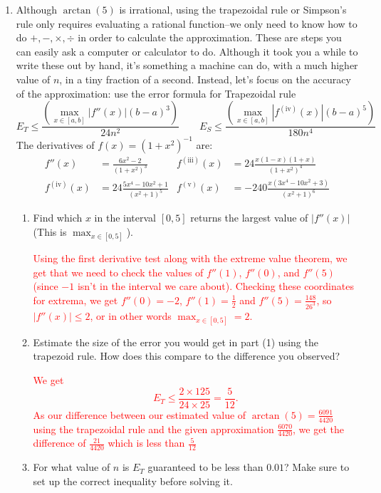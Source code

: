 \documentclass[11pt]{article}
\newcommand{\red}{\textcolor{red}}
\begin{document}
\begin{enumerate}
        \newpage
        \item Although $\arctan(5)$ is irrational, using the trapezoidal rule or Simpson's rule only requires evaluating a rational function--we only need to know how to do $+,-,\times,\div$ in order to calculate the approximation. These are steps you can easily ask a computer or calculator to do. Although it took you a while to write these out by hand, it's something a machine can do, with a much higher value of $n$, in a tiny fraction of a second. Instead, let's focus on the accuracy of the approximation: use the error formula for Trapezoidal rule
        $$E_T \le \frac{(\max_{x\in [a,b]} |f''(x)|(b-a)^3)}{24 n^2} \qquad E_S \le \frac{(\max_{x\in [a,b]} |f^{(\mathrm{iv})}(x)|(b-a)^5)}{180 n^4}
        $$ 
        The derivatives of $f(x) = (1+x^2)^{-1}$ are:
        \begin{align*} 
        f''(x) &= \frac{6x^2-2}{(1+x^2)^3}
        &
        f^{(\mathrm{iii})}(x) &= 24\frac{x(1-x)(1+x)}{(1+x^2)^4} \\
        f^{(\mathrm{iv})}(x) &= 24\frac{5x^4 - 10x^2 + 1}{(x^2 + 1)^5}
        &
        f^{(\mathrm{v})}(x) &= -240\frac{x(3x^4 - 10x^2 + 3)}{(x^2 + 1)^6}
        \end{align*}
        \begin{enumerate}
            \item Find which $x$ in the interval $[0,5]$ returns the largest value of $|f''(x)|$ (This is $\max_{x\in[0,5]}$).
            
            \red{Using the first derivative test along with the extreme value theorem, we get that we need to check the values of  $f''(1)$, $f''(0)$, and $f''(5)$ (since $-1$ isn't in the interval we care about). Checking these coordinates for extrema, we get $f''(0) = -2$, $f''(1) =\frac12$ and $f''(5) = \frac{148}{26^3}$, so $|f''(x)|\le 2$, or in other words $\max_{x\in[0,5]}=2$.}
            
            \item Estimate the size of the error you would get in part (1) using the trapezoid rule. How does this compare to the difference you observed?
            
            \red{We get $$E_T \le \frac{2\times 125 }{24 \times 25} = \frac{5}{12}.$$ As our difference between our estimated value of $\arctan(5)=\frac{6091}{4420}$ using the trapezoidal rule and the given approximation $\frac{6070}{4420}$, we get the difference of $\frac{21}{4420}$ which is less than $\frac{5}{12}$}
            \item For what value of $n$ is $E_T$ guaranteed to be less than $0.01$? Make sure to set up the correct inequality before solving it.
            

\end{enumerate}
\end{enumerate}
\end{document}
